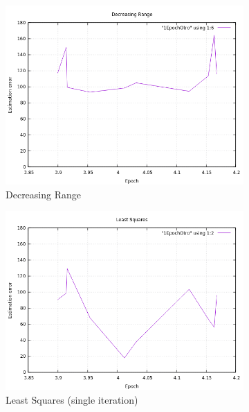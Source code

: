 \begin{figure}[!htb]
	\begin{subfigure}[b]{0.5\textwidth}
		\includegraphics[width=\linewidth]{images/resultsStellar/10Epochs1Epoch/otro/1EpochDR.png}
		\caption{Decreasing Range}
	\end{subfigure}
	\hfill
	\begin{subfigure}[b]{0.5\textwidth}
		\includegraphics[width=\linewidth]{images/resultsStellar/10Epochs1Epoch/otro/1EpochLS1.png}
		\caption{Least Squares (single iteration)}
	\end{subfigure}
	\hfill
	\begin{subfigure}[b]{0.5\textwidth}

\end{subfigure}
\end{figure}
